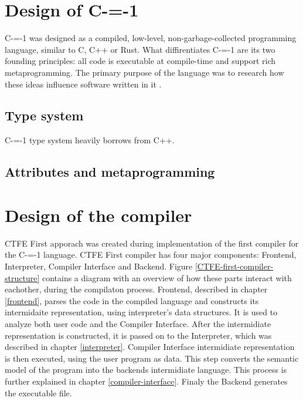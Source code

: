\section{Design of C-=-1}
\label{language-design}

C-=-1 was designed as a compiled, low-level, non-garbage-collected programming language, similar to C, C++ or Rust.
What diffirentiates C-=-1 are its two founding principles: all code is executable at compile-time and support rich metaprogramming.
The primary purpose of the language was to research how these ideas influence software written in it \cite{grabski2022compilation}.

\subsection{Type system}

C-=-1 type system heavily borrows from C++.

\subsection{Attributes and metaprogramming}

\section{Design of the compiler}
\label{compiler-design}

CTFE First apporach was created during implementation of the first compiler for the C-=-1 language\cite{grabski2022compilation}.
CTFE First compiler has four major components: Frontend, Interpreter, Compiler Interface and Backend.
Figure \ref{CTFE-first-compiler-structure} contains a diagram with an overview of how these parts interact with eachother, during the compilaton process.
Frontend, described in chapter \ref{frontend}, parses the code in the compiled language and constructs its intermidaite representation, using interpreter's data structures.
It is used to analyze both user code and the Compiler Interface.
After the intermidiate representation is constructed, it is passed on to the Interpreter, which was described in chapter \ref{interpreter}.
Compiler Interface intermidiate representation is then executed, using the user program as data.
This step converts the semantic model of the program into the backends intermidiate language.
This process is further explained in chapter \ref{compiler-interface}.
Finaly the Backend generates the executable file.

